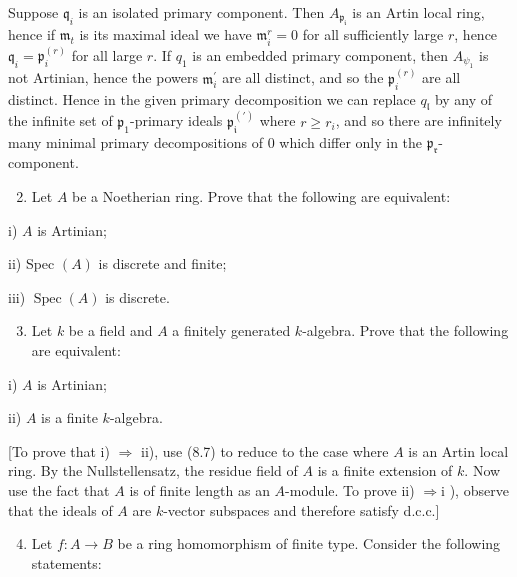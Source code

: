 \documentclass{standalone}
\theoremstyle{definition}
\theoremstyle{remark}
\begin{document}
Suppose $\mathfrak{q}_{i}$ is an isolated primary component. Then $A_{\mathfrak{p}_{\mathfrak{i}}}$ is an Artin local ring, hence if $\mathfrak{m}_{t}$ is its maximal ideal we have $\mathfrak{m}_{i}^{r}=0$ for all sufficiently large $r$, hence $\mathfrak{q}_{i}=\mathfrak{p}_{i}^{(r)}$ for all large $r$. If $q_{1}$ is an embedded primary component, then $A_{\psi_{1}}$ is not Artinian, hence the powers $\mathfrak{m}_{i}^{\prime}$ are all distinct, and so the $\mathfrak{p}_{i}^{(r)}$ are all distinct. Hence in the given primary decomposition we can replace $q_{\mathfrak{l}}$ by any of the infinite set of $\mathfrak{p}_{1}$-primary ideals $\mathfrak{p}_{\mathfrak{i}}^{(\prime)}$ where $r \geqslant r_{i}$, and so there are infinitely many minimal primary decompositions of 0 which differ only in the $\mathfrak{p}_{\mathfrak{r}}$-component.

\begin{enumerate}
  \setcounter{enumi}{1}
  \item Let $A$ be a Noetherian ring. Prove that the following are equivalent:
\end{enumerate}

i) $A$ is Artinian;

ii) Spec $(A)$ is discrete and finite;

iii) $\operatorname{Spec}(A)$ is discrete.

\begin{enumerate}
  \setcounter{enumi}{2}
  \item Let $k$ be a field and $A$ a finitely generated $k$-algebra. Prove that the following are equivalent:
\end{enumerate}

i) $A$ is Artinian;

ii) $A$ is a finite $k$-algebra.

[To prove that i) $\Rightarrow$ ii), use (8.7) to reduce to the case where $A$ is an Artin local ring. By the Nullstellensatz, the residue field of $A$ is a finite extension of $k$. Now use the fact that $A$ is of finite length as an $A$-module. To prove ii) $\Rightarrow \mathrm{i}$ ), observe that the ideals of $A$ are $k$-vector subspaces and therefore satisfy d.c.c.]

\begin{enumerate}
  \setcounter{enumi}{3}
  \item Let $f: A \rightarrow B$ be a ring homomorphism of finite type. Consider the following statements:
\end{enumerate}
\end{document}
